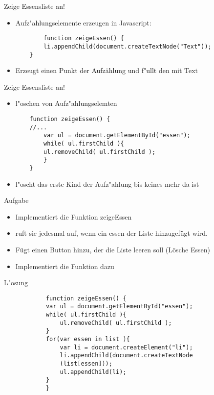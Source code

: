 \documentclass[18pt]{beamer}
\begin{document}
\begin{frame}[fragile]{Zeige Essensliste an!}
\begin{itemize}
	\item Aufz"ahlungselemente erzeugen in Javascript: 
	\begin{lstlisting}
		function zeigeEssen() {
		li.appendChild(document.createTextNode("Text"));
	}
	\end{lstlisting}
	\item Erzeugt einen Punkt der Aufzählung und f"ullt den mit Text
\end{itemize}
\end{frame}


\begin{frame}[fragile]{Zeige Essensliste an!}
\begin{itemize}
	\item l"oschen von Aufz"ahlungselemten
	\begin{lstlisting}
	function zeigeEssen() {
	//...
		var ul = document.getElementById("essen");
		while( ul.firstChild ){
		ul.removeChild( ul.firstChild );
		}
	}
	\end{lstlisting}
	\item l"oscht das erste Kind der Aufz"ahlung bis keines mehr da ist
\end{itemize}

\end{frame}

\begin{frame}[fragile]{Aufgabe}
\begin{itemize}
	\item Implementiert die Funktion zeigeEssen
	\item ruft sie jedesmal auf, wenn ein essen der Liste hinzugefügt wird.
	\item Fügt einen Button hinzu, der die Liste leeren soll (Lösche Essen)
	\item Implementiert die Funktion dazu
\end{itemize}
\end{frame}

\begin{frame}[fragile]{L"osung}
		\begin{lstlisting}
			function zeigeEssen() {
			var ul = document.getElementById("essen");
			while( ul.firstChild ){
				ul.removeChild( ul.firstChild );
			}
			for(var essen in list ){
				var li = document.createElement("li");
				li.appendChild(document.createTextNode
				(list[essen]));
				ul.appendChild(li);
			}
			}
		\end{lstlisting}
\end{frame}
\end{document}
